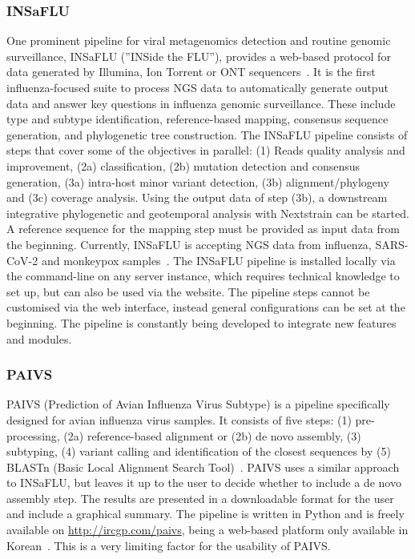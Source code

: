 \subsubsection{INSaFLU}
One prominent pipeline for viral metagenomics detection and routine genomic surveillance, INSaFLU (''INSide the FLU''), provides a web-based protocol for data generated by Illumina, Ion Torrent or ONT sequencers~\cite{borges2018insaflu}. It is the first influenza-focused suite to process NGS data to automatically generate output data and answer key questions in influenza genomic surveillance. These include type and subtype identification, reference-based mapping, consensus sequence generation, and phylogenetic tree construction. The INSaFLU pipeline consists of steps that cover some of the objectives in parallel: (1) Reads quality analysis and improvement, (2a) classification, (2b) mutation detection and consensus generation, (3a) intra-host minor variant detection, (3b) alignment/phylogeny and (3c) coverage analysis. Using the output data of step (3b), a downstream integrative phylogenetic and geotemporal analysis with Nextstrain can be started. A reference sequence for the mapping step must be provided as input data from the beginning. Currently, INSaFLU is accepting NGS data from influenza, SARS-CoV-2 and monkeypox samples~\cite{borges2018insaflu}. The INSaFLU pipeline is installed locally via the command-line on any server instance, which requires technical knowledge to set up, but can also be used via the website. The pipeline steps cannot be customised via the web interface, instead general configurations can be set at the beginning. The pipeline is constantly being developed to integrate new features and modules.

\subsubsection{PAIVS}
PAIVS (Prediction of Avian Influenza Virus Subtype) is a pipeline specifically designed for avian influenza virus samples. It consists of five steps: (1) pre-processing, (2a) reference-based alignment or (2b) de novo assembly, (3) subtyping, (4) variant calling and identification of the closest sequences by (5) BLASTn (Basic Local Alignment Search Tool)~\cite{park2020paivs}. PAIVS uses a similar approach to INSaFLU, but leaves it up to the user to decide whether to include a de novo assembly step. The results are presented in a downloadable format for the user and include a graphical summary.
The pipeline is written in Python and is freely available on \url{http://ircgp.com/paivs}, being a web-based platform only available in Korean~\cite{park2020paivs}. This is a very limiting factor for the usability of PAIVS.

